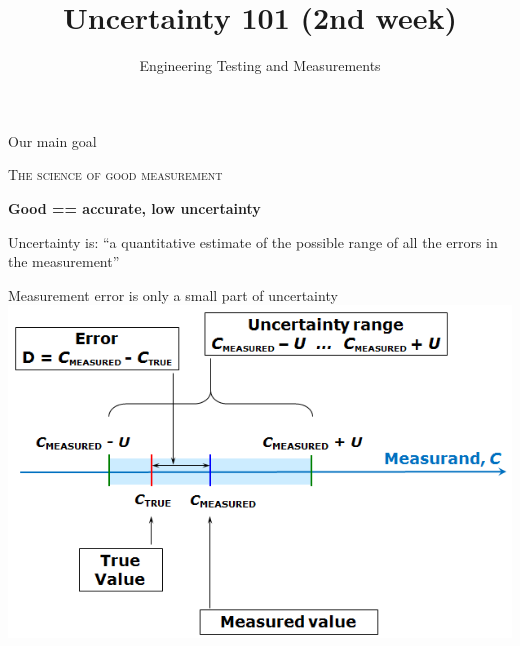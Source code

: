 \documentclass[12pt]{beamer}
\title[Uncertainty]{Uncertainty 101 (2nd week) }
\author{Engineering Testing and Measurements}
\date{}
\begin{document}
\begin{frame}
\titlepage
\end{frame}


\begin{frame}{Our main goal}

\textsc{\Large The science of good measurement}

\vspace{3cm}

\textbf{Good == accurate, low uncertainty}

Uncertainty is: \alert{``a quantitative estimate of the possible range of all the errors in the measurement''} 

\end{frame}


\begin{frame}{Measurement error is only a small part of uncertainty}
\includegraphics[width=.9\textwidth]{error_vs_uncertainty_2}
\end{frame}

%
%
%
%
%
\end{document}
